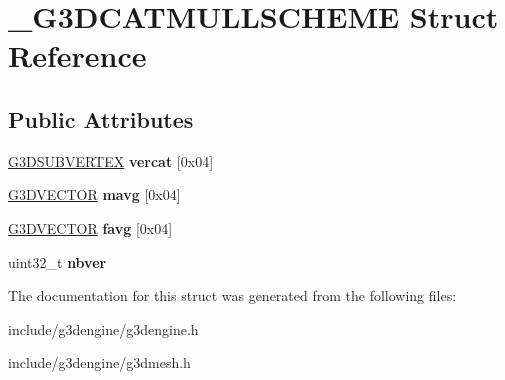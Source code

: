 \hypertarget{struct__G3DCATMULLSCHEME}{}\section{\+\_\+\+G3\+D\+C\+A\+T\+M\+U\+L\+L\+S\+C\+H\+E\+ME Struct Reference}
\label{struct__G3DCATMULLSCHEME}
\subsection*{Public Attributes}
\begin{DoxyCompactItemize}
\item 
\mbox{\label{struct__G3DCATMULLSCHEME_ae597ab9167f679155e75a81e0d6b040b}} 
\hyperlink{struct__G3DINNERVERTEX}{G3\+D\+S\+U\+B\+V\+E\+R\+T\+EX} {\bfseries vercat} \mbox{[}0x04\mbox{]}
\item 
\mbox{\label{struct__G3DCATMULLSCHEME_a0e7c661b1e67831378560ceee35c8459}} 
\hyperlink{structG3DVECTOR}{G3\+D\+V\+E\+C\+T\+OR} {\bfseries mavg} \mbox{[}0x04\mbox{]}
\item 
\mbox{\label{struct__G3DCATMULLSCHEME_adfc2f1043be788f7a0795565e33acea0}} 
\hyperlink{structG3DVECTOR}{G3\+D\+V\+E\+C\+T\+OR} {\bfseries favg} \mbox{[}0x04\mbox{]}
\item 
\mbox{\label{struct__G3DCATMULLSCHEME_a607b38b602882d28cb93774db6bc29e8}} 
uint32\+\_\+t {\bfseries nbver}
\end{DoxyCompactItemize}


The documentation for this struct was generated from the following files\+:\begin{DoxyCompactItemize}
\item 
include/g3dengine/g3dengine.\+h\item 
include/g3dengine/g3dmesh.\+h\end{DoxyCompactItemize}
